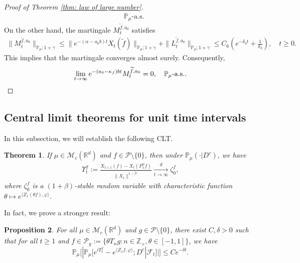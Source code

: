 \documentclass[12pt,a4paper]{amsart}
\theoremstyle{plain}
\newtheorem{thm}{Theorem}[section]
\newtheorem{prop}[thm]{Proposition}
\theoremstyle{definition}
\numberwithin{equation}{section}
\begin{document}
\begin{proof}[Proof of Theorem \ref{thm: law of large number}]
\begin{align}
    \quad \mathbb P_\mu\text{-a.s.}
  \end{align}
  On the other hand, the martingale $M_t^{\widetilde{f},a_0}$ satisfies
  \begin{align}
    \|M_t^{\widetilde{f},a_0}\|_{\mathbb{P}_{\mu};1+\gamma}
    \leq \|e^{-(\alpha-a_0 b)t}X_t(\widetilde{f})\|_{\mathbb{P}_{\mu};1+\gamma}+\|L_t^{\widetilde{f},a_0}\|_{\mathbb{P}_{\mu};1+\gamma}
    \leq C_6(e^{-\delta_3 t}+\frac{1}{\delta_3}),
    \quad t\geq 0.
  \end{align}
  This implies that the martingale converges almost surely.
  Consequently,
  \[
    \lim_{t\rightarrow\infty} e^{-(a_0-\kappa_f)bt}M_t^{\widetilde{f},a_0}
    = 0,
    \quad \mathbb P_\mu\text{-a.s.}.
    \qedhere
  \]
\end{proof}

\subsection{Central limit theorems for unit time intervals}
\label{sec:critical}
In this subsection, we will establish the following CLT.
\begin{thm}
  \label{lem:PR:LC}
If  $\mu \in \mathcal M_c(\mathbb R^d)$ and $f\in \mathcal{P}\setminus \{0\}$,
then  under $\mathbb{P}_{\mu}(\cdot | D ^c)$, we have
  \begin{align}
    \label{eq:PR:LC:1}
    \Upsilon^f_t
    := \frac{X_{t+1} (f) - X_t(P_1^\alpha f)}{\| X_t\|^{1-\tilde \beta}}
    \xrightarrow[t\to \infty]{d}\zeta^f_0,
  \end{align}
  where $\zeta^f_0$ is a $(1+\beta)$-stable random variable with characteristic function $\theta\mapsto e^{\langle Z_1(\theta f), \varphi\rangle}$.
\end{thm}

In fact, we prove a stronger result:

\begin{prop}
  \label{thm:Key}
  For all $\mu \in \mathcal M_c(\mathbb R^d)$ and $g \in \mathcal P \setminus \{0\}$, there exist $C,\delta>0$ such that
  for all $t\geq 1$ and $f \in \mathcal P_g:= \{\theta T_ng:n \in \mathbb Z_+, \theta \in [-1,1]\}$, we have
  \[
    \mathbb P_\mu
    \Big[  |\mathbb P_\mu [e^{i\Upsilon^f_t} - e^{\langle Z_1f, \varphi\rangle}; D^c | \mathscr F_t ]  |\Big]
    \leq C e^{- \delta t}.
  \]
\end{prop}
\end{document}
